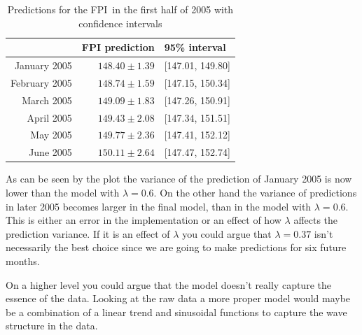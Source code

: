 \documentclass[11pt]{article}
\newcommand\fpi{FPI}
\begin{document}
\begin{table}[ht]
    \begin{center}
    \begin{tabular}{rrl}
      \hline
     & FPI prediction & 95\% interval \\ 
      \hline
    January 2005 & $148.40\pm 1.39$ & [147.01, 149.80] \\ 
      February 2005 & $148.74\pm 1.59$ & [147.15, 150.34] \\ 
      March 2005 & $149.09\pm 1.83$ & [147.26, 150.91] \\ 
      April 2005 & $149.43\pm 2.08$ & [147.34, 151.51] \\ 
      May 2005 & $149.77\pm 2.36$ & [147.41, 152.12] \\ 
      June 2005 & $150.11\pm 2.64$ & [147.47, 152.74] \\ 
       \hline
    \end{tabular}
    \end{center}
    \caption{Predictions for the \fpi\ in the first half of 2005 with confidence intervals}\label{tbl:predictions}
\end{table}

As can be seen by the plot the variance of the prediction of January 2005 is now lower than the model with $\lambda=0.6$. On the other hand the variance of predictions in later 2005 becomes larger in the final model, than in the model with $\lambda=0.6$. This is either an error in the implementation or an effect of how $\lambda$ affects the prediction variance. If it is an effect of $\lambda$ you could argue that $\lambda=0.37$ isn't necessarily the best choice since we are going to make predictions for six future months. \par
On a higher level you could argue that the model doesn't really capture the essence of the data. Looking at the raw data a more proper model would maybe be a combination of a linear trend and sinusoidal functions to capture the wave structure in the data.\par
\end{document}

